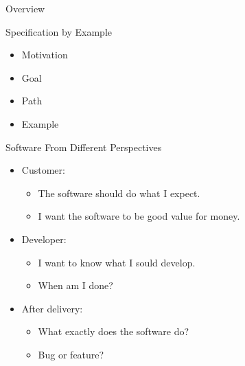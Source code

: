 \begin{frame}{Overview}

\Large{Specification by Example}

\vspace{2em}

\begin{itemize}
	\item Motivation

	\item Goal

	\item Path

	\item Example
\end{itemize}

\end{frame}


\begin{frame}{Software From Different Perspectives}

\begin{itemize}

	
	\item Customer:

	\begin{itemize}
		\item \glqq The software should do what I expect.\grqq
		\item \glqq I want the software to be good value for money.\grqq
	\end{itemize}
	
	
	\item Developer:
	
	\begin{itemize}
		\item \glqq I want to know what I sould develop.\grqq
		\item \glqq When am I done?\grqq
	\end{itemize}
	
	
	\item After delivery:
	
	\begin{itemize}
		\item \glqq What exactly does the software do?\grqq
		\item \glqq Bug or feature?\grqq
	\end{itemize}
\end{itemize}

\end{frame}


